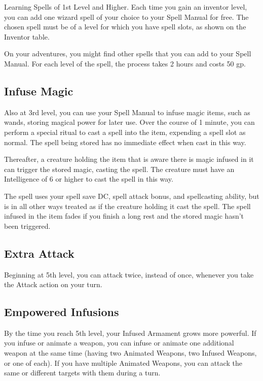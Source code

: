 \documentclass[11pt,twoside,openany]{book}  %
\begin{document}
Learning Spells of 1st Level and Higher. Each time you gain an inventor level, you can add one wizard spell of your choice to your Spell Manual for free. The chosen spell must be of a level for which you have spell slots, as shown on the Inventor table.

On your adventures, you might find other spells that you can add to your Spell Manual. For each level of the spell, the process takes 2 hours and costs 50 gp.

\subsection{Infuse Magic}

Also at 3rd level, you can use your Spell Manual to infuse magic items, such as wands, storing magical power for later use. Over the course of 1 minute, you can perform a special ritual to cast a spell into the item, expending a spell slot as normal. The spell being stored has no immediate effect when cast in this way.

Thereafter, a creature holding the item that is aware there is magic infused in it can trigger the stored magic, casting the spell. The creature must have an Intelligence of 6 or higher to cast the spell in this way.

The spell uses your spell save DC, spell attack bonus, and spellcasting ability, but is in all other ways treated as if the creature holding it cast the spell. The spell infused in the item fades if you finish a long rest and the stored magic hasn’t been triggered.

\subsection{Extra Attack}

Beginning at 5th level, you can attack twice, instead of once, whenever you take the Attack action on your turn.

\subsection{Empowered Infusions}

By the time you reach 5th level, your Infused Armament grows more powerful. If you infuse or animate a weapon, you can infuse or animate one additional weapon at the same time (having two Animated Weapons, two Infused Weapons, or one of each). If you have multiple Animated Weapons, you can attack the same or different targets with them during a turn.
\end{document}

